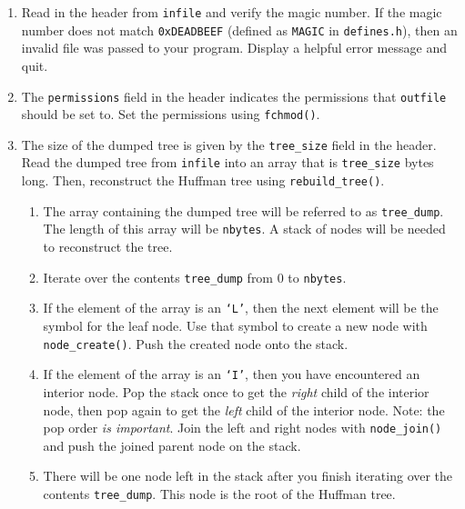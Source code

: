 \documentclass[11pt]{article}
\begin{document}
\begin{enumerate}
  \item Read in the header from \texttt{infile} and verify the magic
    number. If the magic number does not match \texttt{0xDEADBEEF}
    (defined as \texttt{MAGIC} in \texttt{defines.h}), then an invalid
    file was passed to your program. Display a helpful error message and
    quit.

  \item The \texttt{permissions} field in the header indicates the
    permissions that \texttt{outfile} should be set to. Set the
    permissions using \texttt{fchmod()}.

  \item The size of the dumped tree is given by the \texttt{tree\_size}
    field in the header. Read the dumped tree from \texttt{infile} into
    an array that is \texttt{tree\_size} bytes long. Then, reconstruct
    the Huffman tree using \texttt{rebuild\_tree()}.

    \begin{enumerate}
      \item The array containing the dumped tree will be referred to as
        \texttt{tree\_dump}. The length of this array will be
        \texttt{nbytes}. A stack of nodes will be needed to reconstruct
        the tree.

      \item Iterate over the contents \texttt{tree\_dump} from $0$ to
        \texttt{nbytes}.

      \item If the element of the array is an \texttt{`L'}, then the
        next element will be the symbol for the leaf node. Use that
        symbol to create a new node with \texttt{node\_create()}. Push
        the created node onto the stack.

      \item If the element of the array is an \texttt{`I'}, then you
        have encountered an interior node. Pop the stack once to get the
        \emph{right} child of the interior node, then pop again to get
        the \emph{left} child of the interior node. Note: the pop order
        \emph{is important}. Join the left and right nodes with
        \texttt{node\_join()} and push the joined parent node on the
        stack.

      \item There will be one node left in the stack after you finish
        iterating over the contents \texttt{tree\_dump}. This node is
        the root of the Huffman tree.
    \end{enumerate}


\end{enumerate}
\end{document}
